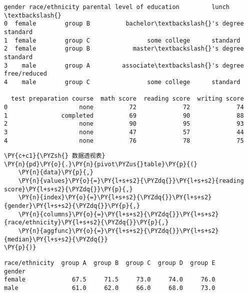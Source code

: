             \begin{tcolorbox}[breakable, size=fbox, boxrule=.5pt, pad at break*=1mm, opacityfill=0]
\begin{Verbatim}[commandchars=\\\{\}]
   gender race/ethnicity parental level of education         lunch  \textbackslash{}
0  female        group B          bachelor\textbackslash{}'s degree      standard
1  female        group C                some college      standard
2  female        group B            master\textbackslash{}'s degree      standard
3    male        group A         associate\textbackslash{}'s degree  free/reduced
4    male        group C                some college      standard

  test preparation course  math score  reading score  writing score
0                    none          72             72             74
1               completed          69             90             88
2                    none          90             95             93
3                    none          47             57             44
4                    none          76             78             75
\end{Verbatim}
\end{tcolorbox}
        
    \begin{tcolorbox}[breakable, size=fbox, boxrule=1pt, pad at break*=1mm,colback=cellbackground, colframe=cellborder]
\begin{Verbatim}[commandchars=\\\{\}]
\PY{c+c1}{\PYZsh{} 数据透视表}
\PY{n}{pd}\PY{o}{.}\PY{n}{pivot\PYZus{}table}\PY{p}{(}
    \PY{n}{data}\PY{p}{,} 
    \PY{n}{values}\PY{o}{=}\PY{l+s+s2}{\PYZdq{}}\PY{l+s+s2}{reading score}\PY{l+s+s2}{\PYZdq{}}\PY{p}{,} 
    \PY{n}{index}\PY{o}{=}\PY{l+s+s2}{\PYZdq{}}\PY{l+s+s2}{gender}\PY{l+s+s2}{\PYZdq{}}\PY{p}{,} 
    \PY{n}{columns}\PY{o}{=}\PY{l+s+s2}{\PYZdq{}}\PY{l+s+s2}{race/ethnicity}\PY{l+s+s2}{\PYZdq{}}\PY{p}{,}
    \PY{n}{aggfunc}\PY{o}{=}\PY{l+s+s2}{\PYZdq{}}\PY{l+s+s2}{median}\PY{l+s+s2}{\PYZdq{}}
\PY{p}{)}
\end{Verbatim}
\end{tcolorbox}

            \begin{tcolorbox}[breakable, size=fbox, boxrule=.5pt, pad at break*=1mm, opacityfill=0]
\begin{Verbatim}[commandchars=\\\{\}]
race/ethnicity  group A  group B  group C  group D  group E
gender
female             67.5     71.5     73.0     74.0     76.0
male               61.0     62.0     66.0     68.0     73.0
\end{Verbatim}
\end{tcolorbox}
